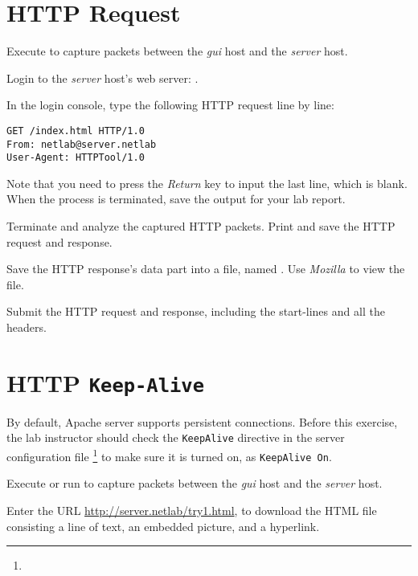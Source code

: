 \documentclass{../UTNetLab}
\begin{document}
\section{HTTP Request}
Execute  to capture packets between the \textit{gui} host and the \textit{server} host.

Login to the \textit{server} host’s web server: .

In the login console, type the following HTTP request line by line:
\begin{lstlisting}[language={HTTP},morekeywords={[2]GET,From,User-Agent},escapechar={},emph={server,netlab}]
GET /index.html HTTP/1.0
From: netlab@server.netlab
User-Agent: HTTPTool/1.0

    \end{lstlisting}
Note that you need to press the \textit{Return} key to input the last line, which is blank.
When the  process is terminated, save the output for your lab report.

Terminate  and analyze the captured HTTP packets.
Print and save the HTTP request and response.

Save the HTTP response’s data part into a file, named .
Use \textit{Mozilla} to view the file.

\begin{report}
    \item Submit the HTTP request and response, including the start-lines and all the headers.
\end{report}


\section{HTTP \texttt{Keep-Alive}}
By default, Apache server supports persistent connections.
Before this exercise, the lab instructor should check the \texttt{KeepAlive} directive in the server configuration file \footnote{} to make sure it is turned on, as \lstinline[language={HTTP}]{KeepAlive On}.

Execute  or run  to capture packets between the \textit{gui} host and the \textit{server} host.


Enter the URL \url{http://server.netlab/try1.html}, to download the HTML file consisting a line of text, an embedded picture, and a hyperlink.
\end{document}
